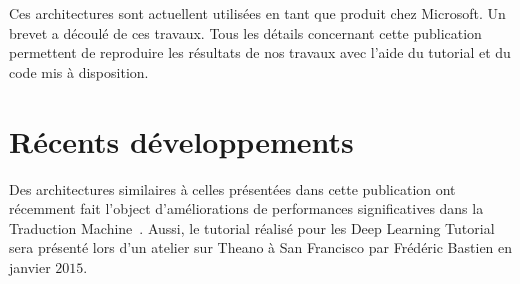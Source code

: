 Ces architectures sont actuellent utilisées en tant que produit chez Microsoft.
Un brevet a découlé de ces travaux. Tous les détails concernant cette
publication permettent de reproduire les résultats de nos travaux avec l'aide
du tutorial et du code mis à disposition. 

\section{R\'{e}cents d\'{e}veloppements}

Des architectures similaires à celles présentées dans cette publication ont
récemment fait l'object d'améliorations de performances significatives dans la
Traduction Machine~\citep{Seq-14}. Aussi, le tutorial réalisé pour les Deep
Learning Tutorial sera présenté lors d'un atelier sur Theano à San Francisco
par Frédéric Bastien en janvier $2015$. 



